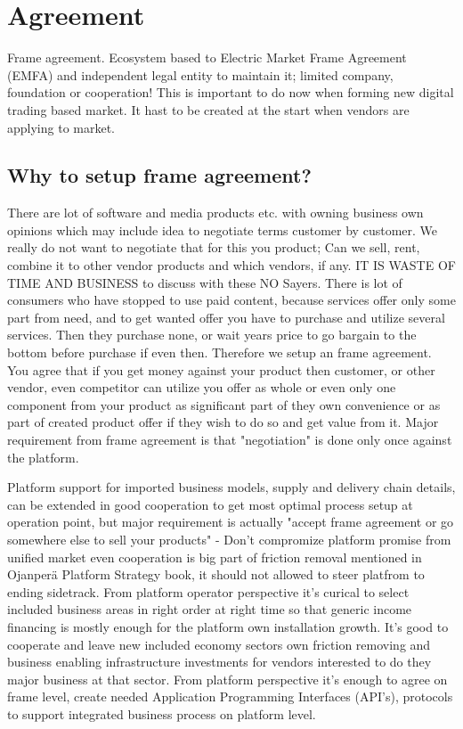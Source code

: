 \section{Agreement}
\label{frame_agreement}
Frame agreement.
Ecosystem based to Electric Market Frame Agreement (EMFA) and independent legal entity to maintain it; limited company, foundation or cooperation! This is important to do now when forming new digital trading based market. It hast to be created at the start when vendors are applying to market.

\subsection{Why to setup frame agreement?}
\label{frame_agreement_why}
There are lot of software and media products etc. with owning business own  opinions which may include idea to negotiate terms customer by customer. We really do not want to negotiate that for this you product; Can we sell, rent, combine it to other vendor products and which vendors, if any. IT IS WASTE OF TIME AND BUSINESS to discuss with these NO Sayers. There is lot of consumers who have stopped to use paid content, because services offer only some part from need, and to get wanted offer you have to purchase and utilize several services. Then they purchase none, or wait years price to go bargain to the bottom before purchase if even then. Therefore we setup an frame agreement. You agree that if you get money against your product then customer, or other vendor, even competitor can utilize you offer as whole or even only one component from your product as significant part of they own convenience or as part of created product offer if they wish to do so and get value from it. Major requirement from frame agreement is that "negotiation" is done only once against the platform.

Platform support for imported business models, supply and delivery chain details, can be extended in good cooperation to get most optimal process setup at operation point, but major requirement is actually "accept frame agreement or go somewhere else to sell your products" - Don't compromize platform promise from unified market even cooperation is big part of friction removal mentioned in Ojanper\"a Platform Strategy book\cite{ojanpera2021platform}, it should not allowed to steer platfrom to ending sidetrack. From platform operator perspective it's curical to select included business areas in right order at right time so that generic income financing is mostly enough for the platform own installation growth. It's good to cooperate and leave new included economy sectors own friction removing and business enabling infrastructure investments for vendors interested to do they major business at that sector. From platform perspective it's enough to agree on frame level, create needed Application Programming Interfaces (API's), protocols to support integrated business process on platform level.

